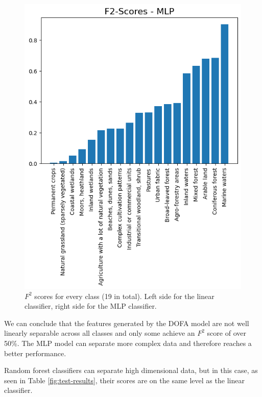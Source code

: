 \begin{figure}[h]
\begin{minipage}[b]{0.48\columnwidth}
    \includegraphics[width=\columnwidth]{images/MLP - f2 scores.png}
  \end{minipage}
  \caption{$F^2$ scores for every class (19 in total). Left side for the linear classifier, right side for the MLP classifier.}
  \label{fig:scores-by-class}
\end{figure}

We can conclude that the features generated by the DOFA model are not well linearly separable across all classes and only some achieve an $F^2$ score of over 50\%. The MLP model can separate more complex data and therefore reaches a better performance.

Random forest classifiers can separate high dimensional data, but in this case, as seen in Table \ref{fig:test-results}, their scores are on the same level as the linear classifier. %

